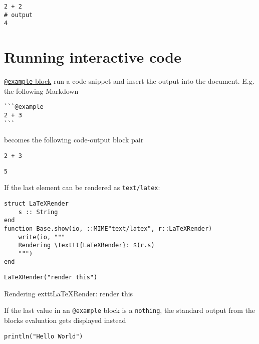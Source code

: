 \begin{verbatim}
2 + 2
# output
4
\end{verbatim}



\section{Running interactive code}



\label{3545462789522369084}{}


\href{@ref}{\texttt{@example} block} run a code snippet and insert the output into the document. E.g. the following Markdown




\begin{lstlisting}
```@example
2 + 3
```
\end{lstlisting}



becomes the following code-output block pair




\begin{verbatim}
2 + 3
\end{verbatim}


\begin{lstlisting}
5
\end{lstlisting}



If the last element can be rendered as \texttt{text/latex}:




\begin{verbatim}
struct LaTeXRender
    s :: String
end
function Base.show(io, ::MIME"text/latex", r::LaTeXRender)
    write(io, """
    Rendering \texttt{LaTeXRender}: $(r.s)
    """)
end
\end{verbatim}




\begin{verbatim}
LaTeXRender("render this")
\end{verbatim}

Rendering 	exttt{LaTeXRender}: render this


If the last value in an \texttt{@example} block is a \texttt{nothing}, the standard output from the blocks{\textquotesingle} evaluation gets displayed instead




\begin{verbatim}
println("Hello World")
\end{verbatim}


